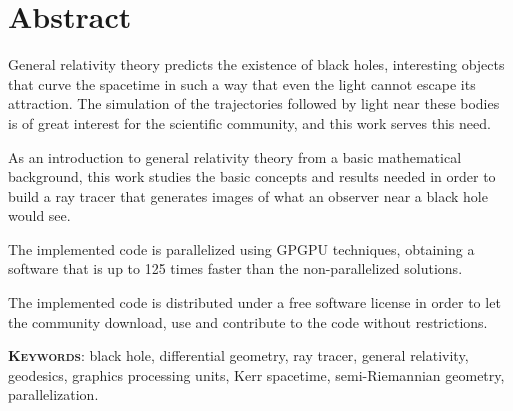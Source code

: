 \begingroup
\let\clearpage\relax
\let\cleardoublepage\relax
\let\cleardoublepage\relax

\chapter*{Abstract}
General relativity theory predicts the existence of black holes, interesting objects that curve the spacetime in such a way that even the light cannot escape its attraction. The simulation of the trajectories followed by light near these bodies is of great interest for the scientific community, and this work serves this need.

As an introduction to general relativity theory from a basic mathematical background, this work studies the basic concepts and results needed in order to build a ray tracer that generates images of what an observer near a black hole would see.

The implemented code is parallelized using \ac{GPGPU} techniques, obtaining a software that is up to 125 times faster than the non-parallelized solutions.

The implemented code is distributed under a free software license in order to let the community download, use and contribute to the code without restrictions.

\vfill

\endgroup

\vfill

\textsc{\textbf{Keywords}}: black hole, differential geometry, ray tracer, general relativity, geodesics, graphics processing units, Kerr spacetime, semi-Riemannian geometry, parallelization.
